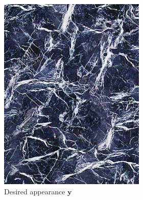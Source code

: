 \begin{figure}[]
    \centering    
    \begin{subfigure}{\textwidth}
        \centering
        \begin{subfigure}{0.2\textwidth}
            \centering
            \vspace*{5mm}
            \includegraphics[width=\textwidth]{images/04-experiment02/human/marble/target.jpg}
            \caption*{Desired appearance \(\bm{y}\)}
        \end{subfigure}
        \hfill
        \begin{subfigure}{0.78\textwidth}
            \centering
            \begin{subfigure}{0.32\textwidth}
                \centering
                \begin{tikzpicture}

\end{tikzpicture}
\end{subfigure}
\end{subfigure}
\end{subfigure}
\end{figure}
